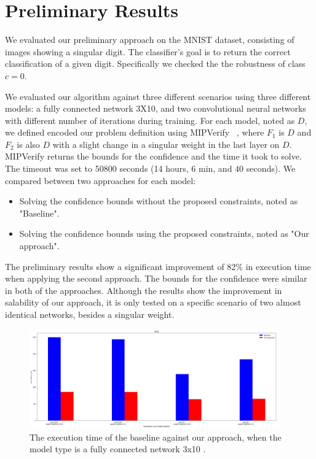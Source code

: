 
\section{Preliminary Results}
We evaluated our preliminary approach on the MNIST dataset, consisting of images showing a singular digit.
The classifier's goal is to return the correct classification of a given digit. Specifically we checked the the robustness of class $c=0$.

We evaluated our algorithm against three different scenarios using three different models: a fully connected network 3X10, and two convolutional neural networks with different number of iterations during training. For each model, noted as $D$, we defined encoded our problem definition using MIPVerify ~\cite{MIPVERIFY}, where $F_1$ is $D$ and $F_2$ is also $D$ with a slight change in a singular weight in the last layer on $D$. MIPVerify returns the bounds for the confidence and the time it took to solve. The timeout was set to 50800 seconds (14 hours, 6 min, and 40 seconds). We compared between two approaches for each model:
\begin{itemize}
    \item Solving the confidence bounds without the proposed constraints, noted as "Baseline".
    \item Solving the confidence bounds using the proposed constraints, noted as "Our approach".
\end{itemize}
The preliminary results show a significant improvement of 82\% in execution time when applying the second approach.
The bounds for the confidence were similar in both of the approaches.
Although the results show the improvement in salability of our approach, it is only tested on a specific scenario of two almost identical networks, besides a singular weight.
\begin{figure}[ht]
  \centering
  \includegraphics[width=0.95\textwidth]{3x10.png}
  \caption{The execution time of the baseline against our approach, when the model type is a fully connected network 3x10 .}
  \label{fig:3_x_10}
\end{figure}

